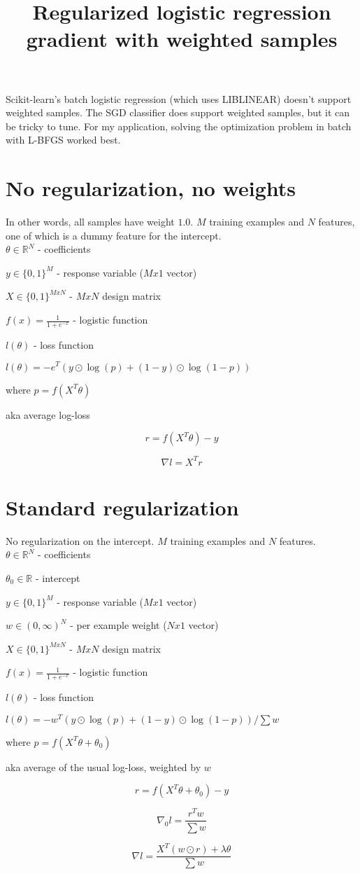 \documentclass[11pt]{article}
\title{Regularized logistic regression gradient with weighted samples}
\begin{document}
\maketitle

Scikit-learn's batch logistic regression (which uses LIBLINEAR) doesn't support weighted
samples. The SGD classifier does support weighted samples, but it can be tricky to tune.
For my application, solving the optimization problem in batch with L-BFGS worked best.

\section*{No regularization, no weights}

In other words, all samples have weight $1.0$. $M$ training examples and $N$ features,
one of which is a dummy feature for the intercept. \\

$\theta \in \mathbb{R}^N$ - coefficients

$y \in \{0, 1\}^M$ - response variable ($M x 1$ vector)

$X \in \{0, 1\}^{MxN}$ - $M x N$ design matrix

$f(x) = \frac{1}{1+e^{-x}}$ - logistic function

$l(\theta)$ - loss function

$l(\theta) = - e^T \left(y \odot \log(p) + (1-y) \odot \log(1-p)\right) $

where $p = f(X^T \theta)$

aka average log-loss

$$r = f(X^T \theta) - y$$

$$\nabla l = X^T r $$

\section*{Standard regularization}

No regularization on the intercept. $M$ training examples and $N$ features. \\

$\theta \in \mathbb{R}^N$ - coefficients

$\theta_0 \in \mathbb{R}$ - intercept

$y \in \{0, 1\}^M$ - response variable ($M x 1$ vector)

$w \in (0, \infty)^N $ - per example weight ($N x 1$ vector)

$X \in \{0, 1\}^{MxN}$ - $M x N$ design matrix

$f(x) = \frac{1}{1+e^{-x}}$ - logistic function

$l(\theta)$ - loss function

$l(\theta) = -w^T \left(y \odot \log(p) + (1-y) \odot \log(1-p)\right) / \sum w $

where $p = f(X^T \theta + \theta_0)$

aka average of the usual log-loss, weighted by $w$

$$r = f(X^T \theta + \theta_0) - y$$

$$\nabla_0 l = \frac{r^T w}{\sum w} $$

$$\nabla l = \frac{X^T (w \odot r) + \lambda \theta}{ \sum w} $$
\end{document}
